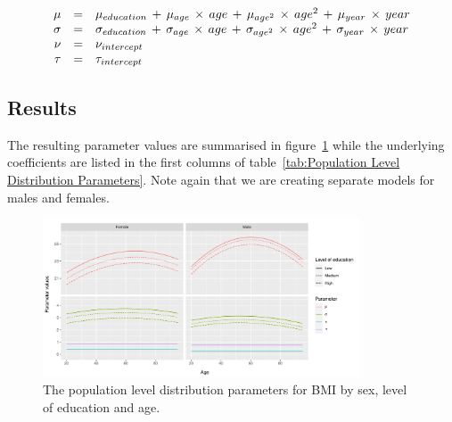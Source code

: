 \documentclass{imammb}
\numberwithin{equation}{section}
\begin{document}
\vspace{-1mm}

\begin{equation}
\label{eq:Population Level Distribution Parameters}
\begin{array}{@{\ }rcl@{\ }}
\mu & = & \mu_{education} \, + \, \mu_{age} \, \times \, age \, + \, \mu_{age^2} \, \times \, age^2 \, + \, \mu_{year} \, \times \, year\\
\sigma & = & \sigma_{education} \, + \, \sigma_{age} \, \times \, age \, + \, \sigma_{age^2} \, \times \, age^2 \, + \, \sigma_{year} \, \times \, year \\
\nu & = & \nu_{intercept}\\
\tau & = & \tau_{intercept}
\end{array}
\end{equation}

\vspace{-5mm}

\subsection{Results}
\label{sec:Population Level Distribution/Results}

The resulting parameter values are summarised in figure~\ref{fig:Population Level Distribution Parameters} while the underlying coefficients are listed in the first columns of table~\ref{tab:Population Level Distribution Parameters}. Note again that we are creating separate models for males and females.

\vspace{-5mm}

\begin{figure}[!h]
\centering
\includegraphics[width=0.84\textwidth] {"Figures/Population Level Distribution Parameters.pdf"}
\caption{The population level distribution parameters for BMI by sex, level of education and age.}
\label{fig:Population Level Distribution Parameters}
\vspace*{-9pt}
\end{figure}
\end{document}
